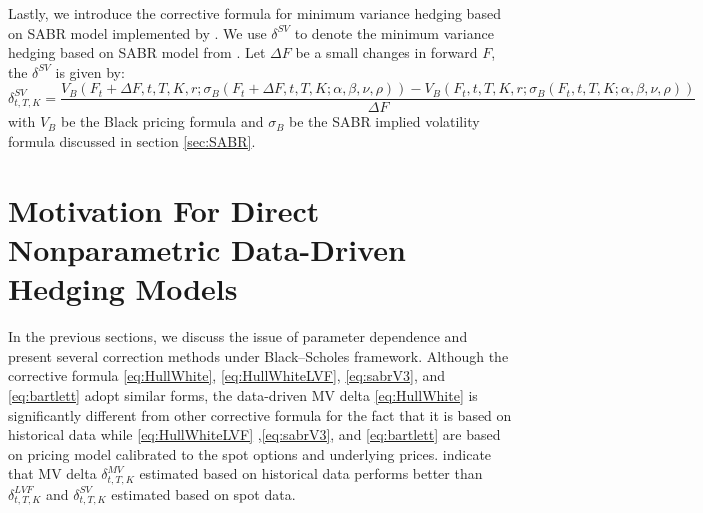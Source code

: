 \documentclass[letterpaper,12pt,titlepage,oneside,final]{book}
\numberwithin{equation}{section}
\theoremstyle{definition}
\begin{document}
Lastly, we introduce the corrective formula for minimum variance hedging  based on  SABR model implemented by  \citet{hulloptimal} . We use $\delta^{SV}$ to denote the minimum variance hedging  based on  SABR model from \cite{hulloptimal}. Let $\Delta F$ be a small changes in forward $F$, the  $\delta^{SV}$ is given by:
\begin{equation}
	\delta^{SV}_{t,T,K}=\frac{V_B(F_t+\Delta F,t,T,K,r;\sigma_B (F_t+\Delta F,t,T,K;\alpha,\beta,\nu,\rho))-V_B(F_t,t,T,K,r;\sigma_B (F_t,t,T,K;\alpha,\beta,\nu,\rho))}{\Delta F}
	\label{eq:HullWhiteSabr}
\end{equation}
with $V_B$ be the Black pricing formula and $\sigma_B$ be the SABR implied volatility formula discussed in section \ref{sec:SABR}. 



\section{Motivation For Direct Nonparametric Data-Driven Hedging Models}
In the previous sections, we discuss the issue of parameter dependence and present several correction methods under Black–Scholes framework. Although the corrective formula   \eqref{eq:HullWhite}, \eqref{eq:HullWhiteLVF}, \eqref{eq:sabrV3}, and \eqref{eq:bartlett} adopt similar forms, the data-driven MV delta \eqref{eq:HullWhite} is significantly different from other corrective formula for the fact that it is based on historical data while \eqref{eq:HullWhiteLVF} ,\eqref{eq:sabrV3}, and \eqref{eq:bartlett} are based on pricing model calibrated to the spot options and underlying prices. \citet{hulloptimal} indicate that MV delta $\delta^{MV}_{t,T,K}$ estimated based on historical data performs better than $\delta^{LVF}_{t,T,K}$ and $\delta^{SV}_{t,T,K}$ estimated based on spot data. 
\end{document}
